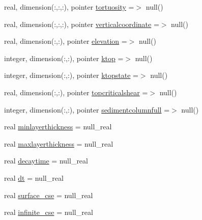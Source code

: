 \begin{DoxyCompactItemize}
\item 
real, dimension(\+:,\+:,\+:), pointer \mbox{\hyperlink{structmoduleconsolidation_1_1t__consolidation_aa533597857d72b644c3e6f18f78ed613}{tortuosity}} =$>$ null()
\item 
real, dimension(\+:,\+:,\+:), pointer \mbox{\hyperlink{structmoduleconsolidation_1_1t__consolidation_aa2cc63130dee6d1041da2218ad3c5502}{verticalcoordinate}} =$>$ null()
\item 
real, dimension(\+:,\+:), pointer \mbox{\hyperlink{structmoduleconsolidation_1_1t__consolidation_ab8ce0c6c274d77d3ecf9cd2ed1be6dda}{elevation}} =$>$ null()
\item 
integer, dimension(\+:,\+:), pointer \mbox{\hyperlink{structmoduleconsolidation_1_1t__consolidation_ab4d7e5fbd005963748e864fabc4d9219}{ktop}} =$>$ null()
\item 
integer, dimension(\+:,\+:), pointer \mbox{\hyperlink{structmoduleconsolidation_1_1t__consolidation_abc009e89edf1a955be6f58a4a12801c5}{ktopstate}} =$>$ null()
\item 
real, dimension(\+:,\+:), pointer \mbox{\hyperlink{structmoduleconsolidation_1_1t__consolidation_a5871fb45b77c1aa41ee7fd7b555d6b70}{topcriticalshear}} =$>$ null()
\item 
integer, dimension(\+:,\+:), pointer \mbox{\hyperlink{structmoduleconsolidation_1_1t__consolidation_aa5511d9c929b3243f29dbc44639eb12d}{sedimentcolumnfull}} =$>$ null()
\item 
real \mbox{\hyperlink{structmoduleconsolidation_1_1t__consolidation_a46331ba8ceac6e9d3fcf6f1913a91bda}{minlayerthickness}} = null\+\_\+real
\item 
real \mbox{\hyperlink{structmoduleconsolidation_1_1t__consolidation_afc408a693a28f77235d36e4937de83d4}{maxlayerthickness}} = null\+\_\+real
\item 
real \mbox{\hyperlink{structmoduleconsolidation_1_1t__consolidation_aede23864bf5405cc9e13f73997f675c2}{decaytime}} = null\+\_\+real
\item 
real \mbox{\hyperlink{structmoduleconsolidation_1_1t__consolidation_aae1d40f772ef2d5654f0d537f545daa6}{dt}} = null\+\_\+real
\item 
real \mbox{\hyperlink{structmoduleconsolidation_1_1t__consolidation_aff4af6689c8b2ef17f93020707f8d68e}{surface\+\_\+cse}} = null\+\_\+real
\item 
real \mbox{\hyperlink{structmoduleconsolidation_1_1t__consolidation_a765e2c3d9ef4f706ab240af07ddb0d61}{infinite\+\_\+cse}} = null\+\_\+real
\item 

\end{DoxyCompactItemize}
